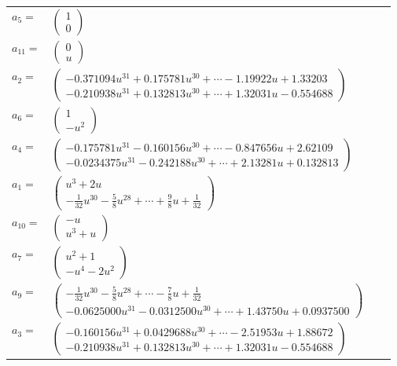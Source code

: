 \documentclass[1p]{elsarticle_modified}
\theoremstyle{definition}
\begin{document}
\begin{tabular}{m{7pt} m{180pt} m{7pt} m{180pt} }
\flushright $a_{5}=$&$\begin{pmatrix}1\\0\end{pmatrix}$ \\
\flushright $a_{11}=$&$\begin{pmatrix}0\\u\end{pmatrix}$ \\
\flushright $a_{2}=$&$\begin{pmatrix}-0.371094 u^{31}+0.175781 u^{30}+\cdots-1.19922 u+1.33203\\-0.210938 u^{31}+0.132813 u^{30}+\cdots+1.32031 u-0.554688\end{pmatrix}$ \\
\flushright $a_{6}=$&$\begin{pmatrix}1\\- u^2\end{pmatrix}$ \\
\flushright $a_{4}=$&$\begin{pmatrix}-0.175781 u^{31}-0.160156 u^{30}+\cdots-0.847656 u+2.62109\\-0.0234375 u^{31}-0.242188 u^{30}+\cdots+2.13281 u+0.132813\end{pmatrix}$ \\
\flushright $a_{1}=$&$\begin{pmatrix}u^3+2 u\\-\frac{1}{32} u^{30}-\frac{5}{8} u^{28}+\cdots+\frac{9}{8} u+\frac{1}{32}\end{pmatrix}$ \\
\flushright $a_{10}=$&$\begin{pmatrix}- u\\u^3+u\end{pmatrix}$ \\
\flushright $a_{7}=$&$\begin{pmatrix}u^2+1\\- u^4-2 u^2\end{pmatrix}$ \\
\flushright $a_{9}=$&$\begin{pmatrix}-\frac{1}{32} u^{30}-\frac{5}{8} u^{28}+\cdots-\frac{7}{8} u+\frac{1}{32}\\-0.0625000 u^{31}-0.0312500 u^{30}+\cdots+1.43750 u+0.0937500\end{pmatrix}$ \\
\flushright $a_{3}=$&$\begin{pmatrix}-0.160156 u^{31}+0.0429688 u^{30}+\cdots-2.51953 u+1.88672\\-0.210938 u^{31}+0.132813 u^{30}+\cdots+1.32031 u-0.554688\end{pmatrix}$ \\

\end{tabular}
\end{document}
